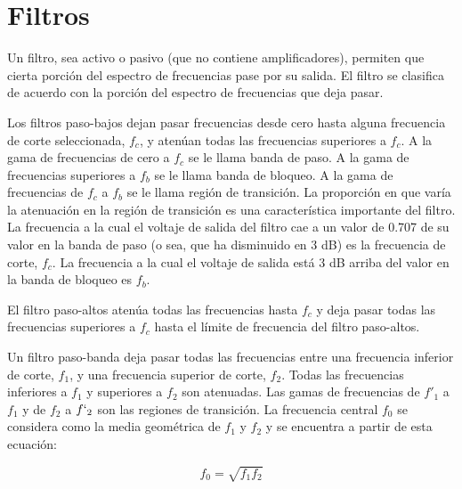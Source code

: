 \chapter{Filtros}

Un filtro, sea activo o pasivo (que no contiene amplificadores), permiten que cierta porción del espectro de frecuencias pase por su salida. El filtro se clasifica de acuerdo con la porción del espectro de frecuencias que deja pasar.

Los filtros paso-bajos dejan pasar frecuencias desde cero hasta alguna frecuencia de corte seleccionada, $f_c$, y atenúan todas las frecuencias superiores a $f_c$. A la gama de frecuencias de cero a $f_c$ se le llama banda de paso. A la gama de frecuencias superiores a $f_b$ se le llama banda de bloqueo. A la gama de frecuencias de $f_c$ a $f_b$ se le llama región de transición. La proporción en que varía la atenuación en la región de transición es una característica importante del filtro. La frecuencia a la cual el voltaje de salida del filtro cae a un valor de 0.707 de su valor en la banda de paso (o sea, que ha disminuido en 3 dB) es la frecuencia de corte, $f_c$. La frecuencia a la cual el voltaje de salida está 3 dB arriba del valor en la banda de bloqueo es $f_b$.

El filtro paso-altos atenúa todas las frecuencias hasta $f_c$ y deja pasar todas las frecuencias superiores a $f_c$ hasta el límite de frecuencia del filtro paso-altos.

Un filtro paso-banda deja pasar todas las frecuencias entre una frecuencia inferior de corte, $f_1$, y una frecuencia superior de corte, $f_2$. Todas las frecuencias inferiores a $f_1$ y superiores a $f_2$ son atenuadas. Las gamas de frecuencias de $f'_1$ a $f_1$ y de $f_2$ a $f`_2$ son las regiones de transición. La frecuencia central $f_0$ se considera como la media geométrica de $f_1$ y $f_2$ y se encuentra a partir de esta ecuación:

\begin{equation}
    f_0 = \sqrt{f_1 f_2}
\end{equation}

